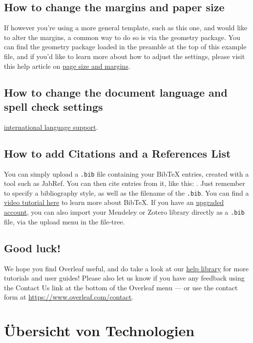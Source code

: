\documentclass[a4paper,12pt]{scrreprt}
\begin{document}
\section{How to change the margins and paper size}
If however you're using a more general template, such as this one, and would like to alter the margins, a common way to do so is via the geometry package. You can find the geometry package loaded in the preamble at the top of this example file, and if you'd like to learn more about how to adjust the settings, please visit this help article on \href{https://www.overleaf.com/learn/latex/page_size_and_margins}{page size and margins}.

\section{How to change the document language and spell check settings}
\href{https://www.overleaf.com/learn/latex/International_language_support}{international language support}.

\section{How to add Citations and a References List}
You can simply upload a \verb|.bib| file containing your BibTeX entries, created with a tool such as JabRef. You can then cite entries from it, like this: \cite{greenwade93}. Just remember to specify a bibliography style, as well as the filename of the \verb|.bib|. You can find a \href{https://www.overleaf.com/help/97-how-to-include-a-bibliography-using-bibtex}{video tutorial here} to learn more about BibTeX.
If you have an \href{https://www.overleaf.com/user/subscription/plans}{upgraded account}, you can also import your Mendeley or Zotero library directly as a \verb|.bib| file, via the upload menu in the file-tree.

\section{Good luck!}
We hope you find Overleaf useful, and do take a look at our \href{https://www.overleaf.com/learn}{help library} for more tutorials and user guides! Please also let us know if you have any feedback using the Contact Us link at the bottom of the Overleaf menu --- or use the contact form at \url{https://www.overleaf.com/contact}.

\chapter{Übersicht von Technologien}
\end{document}
